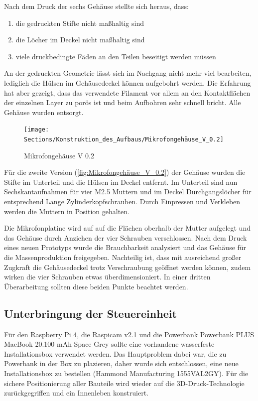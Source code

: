 Nach dem Druck der sechs Gehäuse stellte sich heraus, dass:

\begin{enumerate}
	\item die gedruckten Stifte nicht maßhaltig sind
	\item die Löcher im Deckel nicht maßhaltig sind
	\item viele druckbedingte Fäden an den Teilen beseitigt werden müssen
\end{enumerate}

An der gedruckten Geometrie lässt sich im Nachgang nicht mehr viel bearbeiten, lediglich die Hülsen im Gehäusedeckel können aufgebohrt werden. Die Erfahrung hat aber gezeigt, dass das verwendete Filament vor allem an den Kontaktflächen der einzelnen Layer zu porös ist und beim Aufbohren sehr schnell bricht. Alle Gehäuse wurden entsorgt.

\newpage

\begin{figure}[h]
	\begin{center}
		\texttt{[image: Sections/Konstruktion\_des\_Aufbaus/Mikrofongehäuse\_V\_0.2]}
	\end{center}
	\caption{Mikrofongehäuse V 0.2}
	\label{fig:Mikrofongehäuse_V_0.2}
\end{figure}

Für die zweite Version (\autoref{fig:Mikrofongehäuse_V_0.2}) der Gehäuse wurden die Stifte im Unterteil und die Hülsen im Deckel entfernt. Im Unterteil sind nun Sechskantaufnahmen für vier M2.5 Muttern und im Deckel Durchgangslöcher für entsprechend Lange Zylinderkopfschrauben. Durch Einpressen und Verkleben werden die Muttern in Position gehalten.

Die Mikrofonplatine wird auf auf die Flächen oberhalb der Mutter aufgelegt und das Gehäuse durch Anziehen der vier Schrauben verschlossen. Nach dem Druck eines neuen Prototyps wurde die Brauchbarkeit analysiert und das Gehäuse für die Massenproduktion freigegeben. Nachteilig ist, dass mit ausreichend großer Zugkraft die Gehäusedeckel trotz Verschraubung geöffnet werden können, zudem wirken die vier Schrauben etwas überdimensioniert. In einer dritten Überarbeitung sollten diese beiden Punkte beachtet werden.

\subsection{Unterbringung der Steuereinheit}

Für den Raspberry Pi 4, die Raspicam v2.1 und die Powerbank Powerbank PLUS MacBook 20.100 mAh Space Grey sollte eine vorhandene wasserfeste Installationsbox verwendet werden. Das Hauptproblem dabei war, die zu Powerbank in der Box zu plazieren, daher wurde sich entschlossen, eine neue Installationsbox zu bestellen (Hammond Manufacturing 1555VAL2GY). Für die sichere Positionierung aller Bauteile wird wieder auf die 3D-Druck-Technologie zurückgegriffen und ein Innenleben konstruiert.

